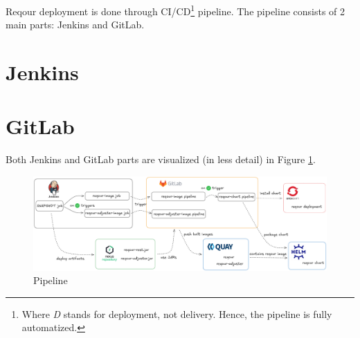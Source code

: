 \documentclass[../main.tex]{subfiles}
\begin{document}






Reqour deployment is done through CI/CD\footnote{Where \textit{D} stands for deployment, not delivery. Hence, the pipeline is fully automatized.} pipeline. The pipeline consists of 2 main parts: Jenkins and GitLab.

\section{Jenkins}


\section{GitLab}


Both Jenkins and GitLab parts are visualized (in less detail) in Figure \ref{fig:pipeline}.

\begin{figure}
  \begin{center}
    \includegraphics[width=\textwidth]{images/pipeline.png}
  \end{center}
  \caption{Pipeline}
  \label{fig:pipeline}
\end{figure}
\end{document}
